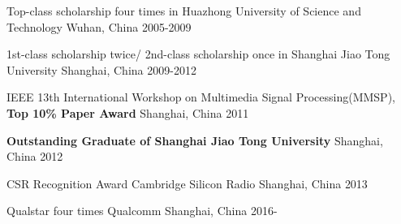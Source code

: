 



\begin{cvhonors}

  \cvhonor
    {} %
    {Top-class scholarship four times in Huazhong University of Science and Technology} %
    {Wuhan, China} %
    {2005-2009} %

  \cvhonor
    {} %
    {1st-class scholarship twice/ 2nd-class scholarship once in Shanghai Jiao Tong University} %
    {Shanghai, China} %
    {2009-2012} %

  \cvhonor
    {} %
    {IEEE 13th International Workshop on Multimedia Signal Processing(MMSP), \textbf{Top 10\% Paper Award}} %
    {Shanghai, China} %
    {2011} %

  \cvhonor
    {} %
    {\textbf{Outstanding Graduate of Shanghai Jiao Tong University}} %
    {Shanghai, China} %
    {2012} %

\end{cvhonors}




\begin{cvhonors}

  \cvhonor
    {CSR Recognition Award} %
    {Cambridge Silicon Radio} %
    {Shanghai, China} %
    {2013} %

  \cvhonor
    {Qualstar four times} %
    {Qualcomm} %
    {Shanghai, China} %
    {2016-} %

\end{cvhonors}
